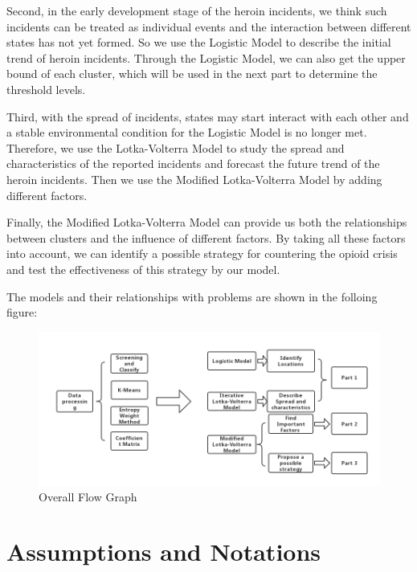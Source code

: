 \documentclass[12pt]{article}
\begin{document}
Second, in the early development stage of the heroin incidents, we think such incidents can be treated as individual events and the interaction between different states has not yet formed. So we use the Logistic Model to describe the initial trend of heroin incidents. Through the Logistic Model, we can also get the upper bound of each cluster, which will be used in the next part to determine the threshold levels.

Third, with the spread of incidents, states may start interact with each other and a stable environmental condition for the Logistic Model is no longer met. Therefore, we use the Lotka-Volterra Model to study the spread and characteristics of the reported incidents and forecast the future trend of the heroin incidents. Then we use the Modified Lotka-Volterra Model by adding different factors.

Finally, the Modified Lotka-Volterra Model can provide us both the relationships between clusters and the influence of different factors. By taking all these factors into account, we can identify a possible strategy for countering the opioid crisis and test the effectiveness of this strategy by our model.

The models and their relationships with problems are shown in the folloing figure:
\begin{figure}[H]
	\centering
	\includegraphics[scale=0.5]{./figures/18.png}
	\caption{Overall Flow Graph}
	\label{Fig18}
\end{figure}

\section{Assumptions and Notations}
\end{document}
